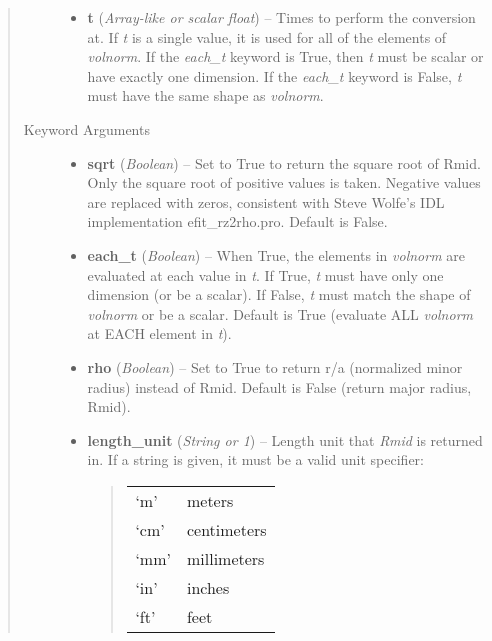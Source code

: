 \documentclass[letterpaper,10pt,english]{sphinxmanual}
\begin{document}
\begin{fulllineitems}
\begin{fulllineitems}
\begin{quote}
\begin{description}
\begin{itemize}
\item {} 
\textbf{t} (\emph{Array-like or scalar float}) --
Times to perform the conversion at.
If \emph{t} is a single value, it is used for all of the elements of
\emph{volnorm}. If the \emph{each\_t} keyword is True, then \emph{t} must be scalar
or have exactly one dimension. If the \emph{each\_t} keyword is False,
\emph{t} must have the same shape as \emph{volnorm}.

\end{itemize}

\item[{Keyword Arguments}] \leavevmode\begin{itemize}
\item {} 
\textbf{sqrt} (\emph{Boolean}) --
Set to True to return the square root of Rmid.
Only the square root of positive values is taken. Negative
values are replaced with zeros, consistent with Steve Wolfe's
IDL implementation efit\_rz2rho.pro. Default is False.

\item {} 
\textbf{each\_t} (\emph{Boolean}) --
When True, the elements in \emph{volnorm} are evaluated
at each value in \emph{t}. If True, \emph{t} must have only one dimension
(or be a scalar). If False, \emph{t} must match the shape of \emph{volnorm}
or be a scalar. Default is True (evaluate ALL \emph{volnorm} at EACH
element in \emph{t}).

\item {} 
\textbf{rho} (\emph{Boolean}) --
Set to True to return r/a (normalized minor radius)
instead of Rmid. Default is False (return major radius, Rmid).

\item {} 
\textbf{length\_unit} (\emph{String or 1}) --
Length unit that \emph{Rmid} is returned in.
If a string is given, it must be a valid unit specifier:
\begin{quote}

\begin{tabulary}{\linewidth}{|L|L|}
\hline

`m'
 & 
meters
\\

`cm'
 & 
centimeters
\\

`mm'
 & 
millimeters
\\

`in'
 & 
inches
\\

`ft'
 & 
feet
\\


\end{tabulary}
\end{quote}
\end{itemize}
\end{description}
\end{quote}
\end{fulllineitems}
\end{fulllineitems}
\end{document}
